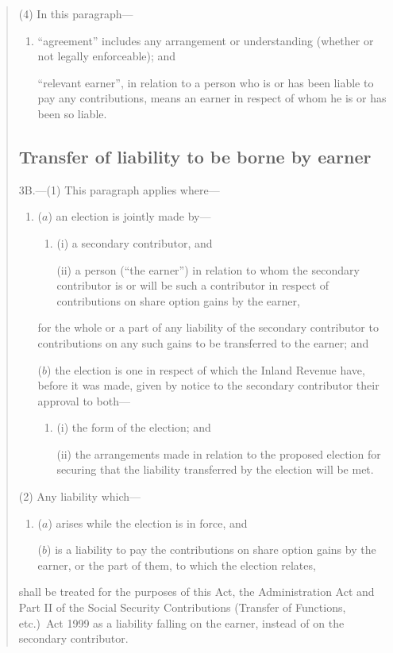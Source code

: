 \documentclass[12pt,a4paper]{article}
\begin{document}
\begin{quotation}
(4) In this paragraph—
\begin{enumerate}\item[]
    “agreement” includes any arrangement or understanding (whether or not legally enforceable); and

    “relevant earner”, in relation to a person who is or has been liable to pay any contributions, means an earner in respect of whom he is or has been so liable. 
\end{enumerate}

\subsection*{Transfer of liability to be borne by earner}

3B.---(1) This paragraph applies where—
\begin{enumerate}\item[]
($a$) an election is jointly made by—
\begin{enumerate}\item[]
(i) a secondary contributor, and

(ii) a person (“the earner”) in relation to whom the secondary contributor is or will be such a contributor in respect of contributions on share option gains by the earner,
\end{enumerate}
for the whole or a part of any liability of the secondary contributor to contributions on any such gains to be transferred to the earner; and

($b$) the election is one in respect of which the Inland Revenue have, before it was made, given by notice to the secondary contributor their approval to both—
\begin{enumerate}\item[]
(i) the form of the election; and

(ii) the arrangements made in relation to the proposed election for securing that the liability transferred by the election will be met.
\end{enumerate}
\end{enumerate}

(2) Any liability which—
\begin{enumerate}\item[]
($a$) arises while the election is in force, and

($b$) is a liability to pay the contributions on share option gains by the earner, or the part of them, to which the election relates,
\end{enumerate}
shall be treated for the purposes of this Act, the Administration Act and Part II of the Social Security Contributions (Transfer of Functions, etc.)\ Act 1999 as a liability falling on the earner, instead of on the secondary contributor.


\end{quotation}
\end{document}

